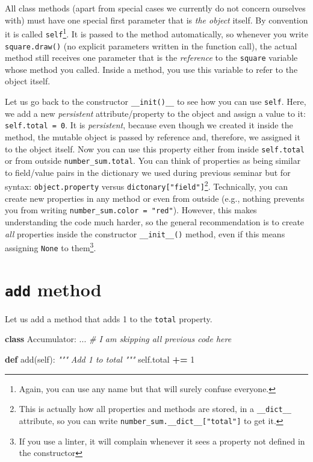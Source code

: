 \documentclass[
]{book}
\newenvironment{Shaded}{\begin{snugshade}}{\end{snugshade}}
\newcommand{\CommentTok}[1]{\textcolor[rgb]{0.56,0.35,0.01}{\textit{#1}}}
\newcommand{\DecValTok}[1]{\textcolor[rgb]{0.00,0.00,0.81}{#1}}
\newcommand{\KeywordTok}[1]{\textcolor[rgb]{0.13,0.29,0.53}{\textbf{#1}}}
\newcommand{\NormalTok}[1]{#1}
\newcommand{\OperatorTok}[1]{\textcolor[rgb]{0.81,0.36,0.00}{\textbf{#1}}}
\newcommand{\VariableTok}[1]{\textcolor[rgb]{0.00,0.00,0.00}{#1}}
\begin{document}
All class methods (apart from special cases we currently do not concern ourselves with) must have one special first parameter that is \emph{the object} itself. By convention it is called \texttt{self}\footnote{Again, you can use any name but that will surely confuse everyone.}. It is passed to the method automatically, so whenever you write \texttt{square.draw()} (no explicit parameters written in the function call), the actual method still receives one parameter that is the \emph{reference} to the \texttt{square} variable whose method you called. Inside a method, you use this variable to refer to the object itself.

Let us go back to the constructor \texttt{\_\_init()\_\_} to see how you can use \texttt{self}. Here, we add a new \emph{persistent} attribute/property to the object and assign a value to it: \texttt{self.total\ =\ 0}. It is \emph{persistent}, because even though we created it inside the method, the mutable object is passed by reference and, therefore, we assigned it to the object itself. Now you can use this property either from inside \texttt{self.total} or from outside \texttt{number\_sum.total}. You can think of properties as being similar to field/value pairs in the dictionary we used during previous seminar but for syntax: \texttt{object.property} versus \texttt{dictonary{[}"field"{]}}\footnote{This is actually how all properties and methods are stored, in a \texttt{\_\_dict\_\_} attribute, so you can write \texttt{number\_sum.\_\_dict\_\_{[}"total"{]}} to get it.}. Technically, you can create new properties in any method or even from outside (e.g., nothing prevents you from writing \texttt{number\_sum.color\ =\ "red"}). However, this makes understanding the code much harder, so the general recommendation is to create \emph{all} properties inside the constructor \texttt{\_\_init\_\_()} method, even if this means assigning \texttt{None} to them\footnote{If you use a linter, it will complain whenever it sees a property not defined in the constructor}.

\hypertarget{add-method}{%
\section{\texorpdfstring{\texttt{add} method}{add method}}\label{add-method}}

Let us add a method that adds 1 to the \texttt{total} property.

\begin{Shaded}
\begin{Highlighting}[]
\KeywordTok{class}\NormalTok{ Accumulator:}
\NormalTok{    ... }\CommentTok{\# I am skipping all previous code here}
    
    \KeywordTok{def}\NormalTok{ add(}\VariableTok{self}\NormalTok{):}
        \CommentTok{"""}
\CommentTok{        Add 1 to total}
\CommentTok{        """}
        \VariableTok{self}\NormalTok{.total }\OperatorTok{+=} \DecValTok{1}
\end{Highlighting}
\end{Shaded}
\end{document}
